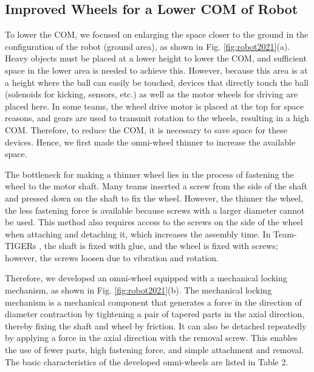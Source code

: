 \documentclass[]{llncs}
\begin{document}
\subsection{Improved Wheels for a Lower COM of Robot}
%
To lower the COM, we focused on enlarging the space closer to the ground in the configuration of the robot (ground area), as shown in Fig. \ref{fig:robot2021}(a).
%
Heavy objects must be placed at a lower height to lower the COM, and sufficient space in the lower area is needed to achieve this.
%
However, because this area is at a height where the ball can easily be touched, devices that directly touch the ball (solenoids for kicking, sensors, etc.) as well as the motor wheels for driving are placed here.
%
In some teams, the wheel drive motor is placed at the top for space reasons, and gears are used to transmit rotation to the wheels, resulting in a high COM.
%
Therefore, to reduce the COM, it is necessary to save space for these devices. Hence, we first made the omni-wheel thinner to increase the available space.
%

The bottleneck for making a thinner wheel lies in the process of fastening the wheel to the motor shaft.
%
Many teams inserted a screw from the side of the shaft and pressed down on the shaft to fix the wheel.
%
However, the thinner the wheel, the less fastening force is available because screws with a larger diameter cannot be used.
%
This method also requires access to the screws on the side of the wheel when attaching and detaching it, which increases the assembly time.
%
In Team-TIGERs \cite{tigers2020}, the shaft is fixed with glue, and the wheel is fixed with screws; however, the screws loosen due to vibration and rotation.
%

Therefore, we developed an omni-wheel equipped with a mechanical locking mechanism, as shown in Fig. \ref{fig:robot2021}(b).
%
The mechanical locking mechanism is a mechanical component that generates a force in the direction of diameter contraction by tightening a pair of tapered parts in the axial direction, thereby fixing the shaft and wheel by friction.
%
It can also be detached repeatedly by applying a force in the axial direction with the removal screw.
%
This enables the use of fewer parts, high fastening force, and simple attachment and removal. The basic characteristics of the developed omni-wheels are listed in Table 2.
%
\end{document}
